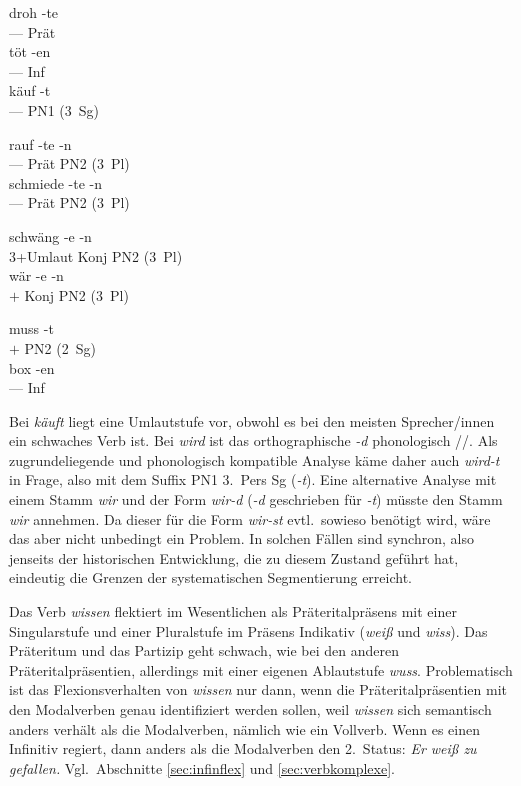 \begin{exe}
\begin{xlist}
    \ex\gll droh -te\\
    --- Prät\\
    \ex\gll töt -en\\
    --- Inf\\
    \ex\gll käuf -t\\
    --- {PN1 (3~Sg)}\\
  \end{xlist}
  \ex
  \begin{xlist}
    \ex\gll rauf -te -n\\
    --- Prät {PN2 (3~Pl)}\\
    \ex\gll schmiede -te -n\\
    --- Prät {PN2 (3~Pl)}\\
  \end{xlist}
  \ex
  \begin{xlist}
    \ex\gll schwäng -e -n\\
    3+Umlaut Konj {PN2 (3~Pl)}\\
    \ex\gll wär -e -n\\
    $+$ Konj {PN2 (3~Pl)}\\
  \end{xlist}
  \ex
  \begin{xlist}
    \ex\gll muss -t\\
    $+$ {PN2 (2~Sg)}\\
    \ex\gll box -en\\
    --- Inf\\
  \end{xlist}
\end{exe}

Bei \textit{käuft} liegt eine Umlautstufe vor, obwohl es bei den meisten Sprecher\slash innen ein schwaches Verb ist.
Bei \textit{wird} ist das orthographische \textit{-d} phonologisch //.
Als zugrundeliegende und phonologisch kompatible Analyse käme daher auch \textit{wird-t} in Frage, also mit dem Suffix PN1 3.~Pers Sg (\textit{-t}).
Eine alternative Analyse mit einem Stamm \textit{wir} und der Form \textit{wir-d} (\textit{-d} geschrieben für \textit{-t}) müsste den Stamm \textit{wir} annehmen.
Da dieser für die Form \textit{wir-st} evtl.\ sowieso benötigt wird, wäre das aber nicht unbedingt ein Problem.
In solchen Fällen sind synchron, also jenseits der historischen Entwicklung, die zu diesem Zustand geführt hat, eindeutig die Grenzen der systematischen Segmentierung erreicht.


Das Verb \textit{wissen} flektiert im Wesentlichen als Präteritalpräsens mit einer Singularstufe und einer Pluralstufe im Präsens Indikativ (\textit{weiß} und \textit{wiss}).
Das Präteritum und das Partizip geht schwach, wie bei den anderen Präteritalpräsentien, allerdings mit einer eigenen Ablautstufe \textit{wuss}.
Problematisch ist das Flexionsverhalten von \textit{wissen} nur dann, wenn die Präteritalpräsentien mit den Modalverben genau identifiziert werden sollen, weil \textit{wissen} sich semantisch anders verhält als die Modalverben, nämlich wie ein Vollverb.
Wenn es einen Infinitiv regiert, dann anders als die Modalverben den 2.~Status: \textit{Er weiß zu gefallen.}
Vgl.\ Abschnitte \ref{sec:infinflex} und \ref{sec:verbkomplexe}.

